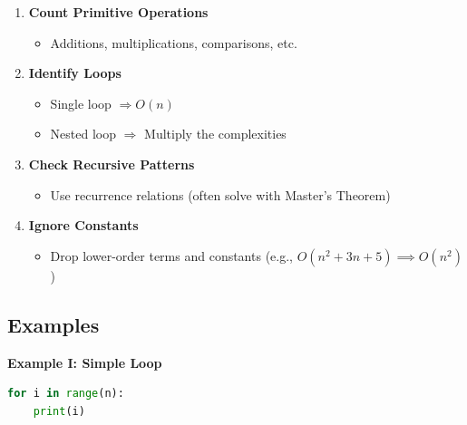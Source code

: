 \begin{enumerate}

    \item \textbf{Count Primitive Operations}

    \begin{itemize}

        \item Additions, multiplications, comparisons, etc.

    \end{itemize}

    \item \textbf{Identify Loops}

    \begin{itemize}

        \item Single loop \(\Rightarrow O(n)\)

        \item Nested loop \(\Rightarrow\) Multiply the complexities

    \end{itemize}

    \item \textbf{Check Recursive Patterns}

    \begin{itemize}

        \item Use recurrence relations (often solve with Master's Theorem)

    \end{itemize}

    \item \textbf{Ignore Constants}

    \begin{itemize}

        \item Drop lower-order terms and constants (e.g., \(O(n^2 + 3n + 5) \implies O(n^2)\))

    \end{itemize}

\end{enumerate}

\subsection{Examples}

\textbf{Example I: Simple Loop}

\begin{lstlisting}[language=Python]
for i in range(n):
    print(i)
\end{lstlisting}

